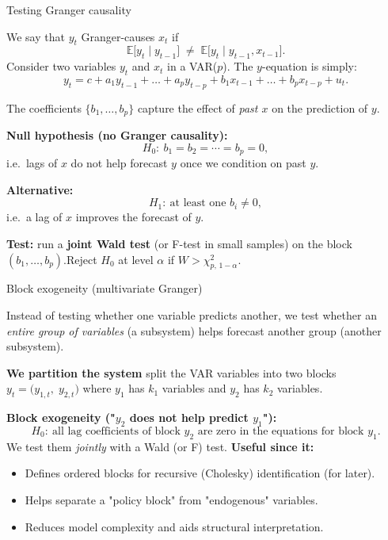 \documentclass{beamer}
\begin{document}
\begin{frame}{Testing Granger causality}
\small

We say that $y_{t}$ Granger-causes $x_{t}$ if
\[
\mathbb{E}\big[ y_{t} \mid y_{t-1} \big]
\;\neq\;
\mathbb{E}\big[ y_{t} \mid y_{t-1}, x_{t-1} \big].
\]
Consider two variables $y_t$ and $x_t$ in a VAR($p$). The $y$-equation is simply:
\[
y_t 
= c 
+ a_1 y_{t-1} + \dots + a_p y_{t-p}
+ b_1 x_{t-1} + \dots + b_p x_{t-p}
+ u_t.
\]

The coefficients $\{b_1,\dots,b_p\}$ capture the effect of \emph{past $x$} on the prediction of $y$.

\medskip

\textbf{Null hypothesis (no Granger causality):}
\[
H_0:\ b_1 = b_2 = \cdots = b_p = 0,
\]
i.e.\ lags of $x$ do not help forecast $y$ once we condition on past $y$.

\textbf{Alternative:}
\[
H_1:\ \text{at least one } b_i \neq 0,
\]
i.e.\ a lag of $x$ improves the forecast of $y$.

\medskip

\textbf{Test:} run a \textbf{joint Wald test} (or F-test in small samples)   on the block $(b_1,\dots,b_p)$.\newline Reject $H_0$ at level $\alpha$ if $W > \chi^2_{p,\,1-\alpha}$.

\end{frame}

\begin{frame}{Block exogeneity (multivariate Granger)}
\small

Instead of testing whether one variable predicts another,  we test whether an \emph{entire group of variables} (a subsystem) helps forecast another group (another subsystem).

\medskip

\textbf{We partition the system} split the VAR variables into two blocks $y_t = \big( y_{1,t},\; y_{2,t} \big)$ where $y_1$ has $k_1$ variables and $y_2$ has $k_2$ variables.

\medskip

\textbf{Block exogeneity ("$y_2$ does not help predict $y_1$"):}  
\[
H_0:\ \text{all lag coefficients of block } y_2 
      \text{ are zero in the equations for block } y_1.
\]
We test them \emph{jointly} with a Wald (or F) test.
\medskip
\textbf{Useful since it:}
\begin{itemize}
    \item Defines ordered blocks for recursive (Cholesky) identification (for later).
    \item Helps separate a "policy block" from "endogenous" variables.
    \item Reduces model complexity and aids structural interpretation.
\end{itemize}

\end{frame}
\end{document}
